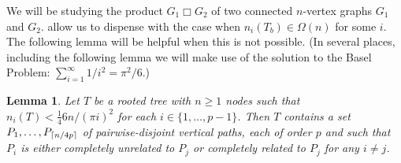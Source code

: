 \documentclass[kpfonts,lotsofwhite]{patmorin}
\newcommand{\boxprod}{\mathbin{\Box}}
\DeclarePairedDelimiter{\ceil}{\lceil}{\rceil}
\renewcommand{\ge}{\geqslant}
\theoremstyle{plain}
\newtheorem{lem}[thm]{Lemma}
\theoremstyle{definition}
\begin{document}
We will be studying the product $G_1\boxprod G_2$ of two connected $n$-vertex graphs $G_1$ and $G_2$.  allow us to dispense with the case when $n_i(T_b)\in\Omega(n)$ for some $i$. The following lemma will be helpful when this is not possible.  (In several places, including the following lemma we will make use of the solution to the Basel Problem: $\sum_{i=1}^\infty 1/i^2 = \pi^2/6$.)

\begin{lem}\label{disjoint_p_paths}
  Let $T$ be a rooted tree with $n\ge 1$ nodes such that $n_i(T)< \tfrac{1}{4}6n/(\pi i)^2$ for each $i\in\{1,\ldots,p-1\}$.  Then $T$ contains a set $P_1,\ldots,P_{\ceil{n/4p}}$ of pairwise-disjoint vertical paths, each of order $p$ and such that $P_i$ is either completely unrelated to $P_j$ or completely related to $P_j$ for any $i\neq j$.
\end{lem}
\end{document}
